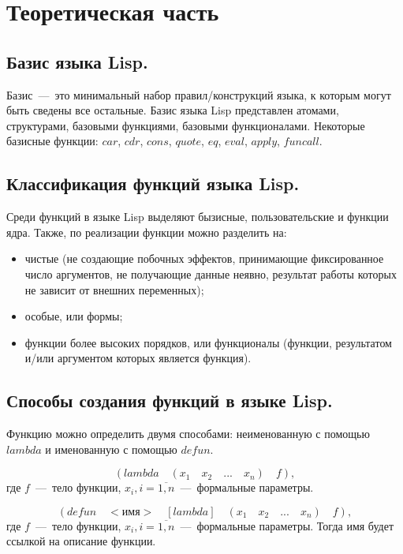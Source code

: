 \setcounter{page}{3}
\chapter{Теоретическая часть}
\section{Базис языка Lisp.}
Базис~---~это минимальный набор правил/конструкций языка, к которым могут быть сведены все остальные. Базис языка Lisp представлен атомами, структурами, базовыми функциями, базовыми функционалами. Некоторые базисные функции: $car$, $cdr$, $cons$, $quote$, $eq$, $eval$, $apply$, $funcall$.

\section{Классификация функций языка Lisp.}
Среди функций в языке Lisp выделяют бызисные, пользовательские и функции ядра. Также, по реализации функции можно разделить на:
\begin{itemize}
	\item чистые (не создающие побочных эффектов, принимающие фиксированное число аргументов, не получающие данные неявно, результат работы которых не зависит от внешних переменных);
	\item особые, или формы;
	\item функции более высоких порядков, или функционалы (функции, результатом и/или аргументом которых является функция).
\end{itemize}

\section{Способы создания функций в языке Lisp.}
Функцию можно определить двумя способами: неименованную с помощью $lambda$ и именованную с помощью $defun$.

\begin{equation}
	\nonumber (lambda \quad (x_1 \quad x_2 \quad ... \quad x_n) \quad f),
\end{equation}
где $f$~---~тело функции, $x_i, i = \overline{1, n}$~---~формальные параметры.

\begin{equation}
	\nonumber (defun \quad <\text{имя}> \quad [lambda] \quad (x_1 \quad x_2 \quad ... \quad x_n) \quad f),
\end{equation}
где $f$~---~тело функции, $x_i, i = \overline{1, n}$~---~формальные параметры. Тогда имя будет ссылкой на описание функции.

